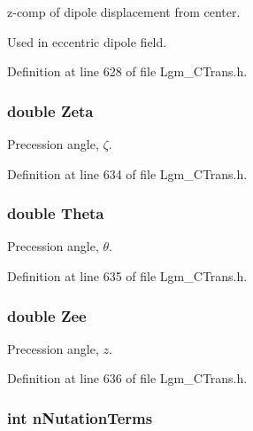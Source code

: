 z-comp of dipole displacement from center. 

Used in eccentric dipole field. 

Definition at line 628 of file Lgm\_\-CTrans.h.\hypertarget{struct_lgm___c_trans_7e97ac28698cae83ebf4b304dbbae40a}{
\subsubsection[{Zeta}]{\setlength{\rightskip}{0pt plus 5cm}double {\bf Zeta}}}
\label{struct_lgm___c_trans_7e97ac28698cae83ebf4b304dbbae40a}


Precession angle, $\zeta$. 



Definition at line 634 of file Lgm\_\-CTrans.h.\hypertarget{struct_lgm___c_trans_1f9ad133d6f1c336ecc4b50959393dde}{
\subsubsection[{Theta}]{\setlength{\rightskip}{0pt plus 5cm}double {\bf Theta}}}
\label{struct_lgm___c_trans_1f9ad133d6f1c336ecc4b50959393dde}


Precession angle, $\theta$. 



Definition at line 635 of file Lgm\_\-CTrans.h.\hypertarget{struct_lgm___c_trans_913357aae0e0cb66e4bae0969b0855c4}{
\subsubsection[{Zee}]{\setlength{\rightskip}{0pt plus 5cm}double {\bf Zee}}}
\label{struct_lgm___c_trans_913357aae0e0cb66e4bae0969b0855c4}


Precession angle, $z$. 



Definition at line 636 of file Lgm\_\-CTrans.h.\hypertarget{struct_lgm___c_trans_dc45647f0571d420274eddb4f11aa358}{
\subsubsection[{nNutationTerms}]{\setlength{\rightskip}{0pt plus 5cm}int {\bf nNutationTerms}}}
\label{struct_lgm___c_trans_dc45647f0571d420274eddb4f11aa358}


